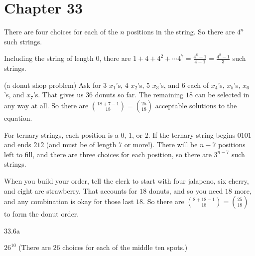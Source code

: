    \section*{Chapter 33}
    
\begin{Solution}{33.1}

There are four choices for each of the $n$ positions in the string. So there are $4^n$ such strings.

\end{Solution}

\begin{Solution}{33.2}

Including the string of length $0$, there are 
$1+4+4^2+\cdots 4^7 = \frac{4^8-1}{4-1} = \frac{4^8-1}{3}$ such strings.

\end{Solution}


\begin{Solution}{33.3}

(a donut shop problem) Ask for $3$ $x_1$'s, $4$ $x_2$'s, $5$ $x_3$'s, and $6$ each of $x_4$'s, $x_5$'s, $x_6$'s, and $x_7$'s. That gives us $36$ donuts so far. The remaining $18$ can be selected in any way at all. So there are
$\binom{18+7-1}{18} = \binom{25}{18}$ acceptable solutions to the equation.

\end{Solution}

\begin{Solution}{33.4}

For ternary strings, each position is a $0$, $1$, or $2$. If the ternary string begins $0101$ and ends $212$
(and must be of length $7$ or more!). There will be $n-7$ positions left to fill, and there are three choices for each position, so there are $3^{n-7}$ such strings.

\end{Solution}

\begin{Solution}{33.5}
When you build your order, tell the clerk to start with four jalapeno,  six  cherry, and eight are strawberry. That accounts for $18$ donuts, and so you need $18$ more, and any combination is okay for those last $18$. So there are $\binom{8 + 18 -1}{18} = \binom{25}{18}$ to form the donut order.
\end{Solution}

\begin{Solution}{33.6a}

$26^{10}$ (There are $26$ choices for each of the middle ten spots.)

\end{Solution}

